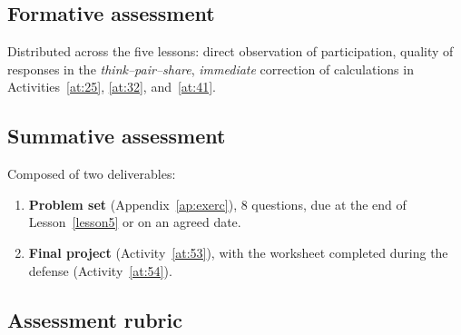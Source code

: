 \documentclass[12pt,a4paper]{scrartcl}
\begin{document}
\subsection{Formative assessment}
Distributed across the five lessons: direct observation of participation, quality of responses in the \emph{think--pair--share}, \emph{immediate} correction of calculations in Activities~\ref{at:25}, \ref{at:32}, and~\ref{at:41}.

\subsection{Summative assessment}
Composed of two deliverables:

\begin{enumerate}[leftmargin=1.5em,itemsep=0.2em,topsep=0.3em,nosep]
  \item \textbf{Problem set} (Appendix~\ref{ap:exerc}), 8 questions, due at the end of Lesson~\ref{lesson5} or on an agreed date.
  \item \textbf{Final project} (Activity~\ref{at:53}), with the worksheet completed during the defense (Activity~\ref{at:54}).
\end{enumerate}

\subsection{Assessment rubric}
\end{document}

